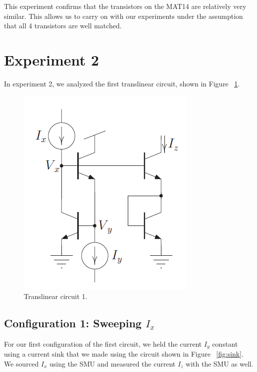 \documentclass{article}
\begin{document}
This experiment confirms that the transistors on the MAT14 are relatively very similar. This allows us to carry on with our experiments under the assumption that all 4 transistors are well matched.
\section*{Experiment 2}

In experiment 2, we analyzed the first translinear circuit, shown in Figure ~\ref{fig:tl1}.

\begin{figure}[H]
\begin{center}
\includegraphics[scale=.5]{tl1.png}
\caption{Translinear circuit 1.}
\label{fig:tl1}
\end{center}
\end{figure}

\subsection*{Configuration 1: Sweeping $I_x$}

For our first configuration of the first circuit, we held the current $I_y$ constant using a current sink that we made using the circuit shown in Figure ~\ref{fig:sink}.  We sourced $I_x$ using the SMU and measured the current $I_z$ with the SMU as well.
\end{document}

